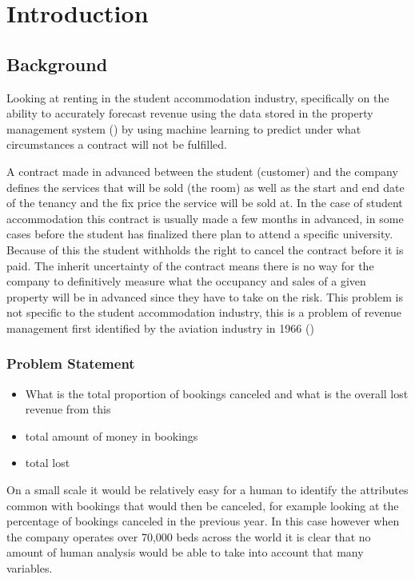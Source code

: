 \chapter{Introduction}

\section{Background}
Looking at renting in the student accommodation industry, specifically on the ability to accurately forecast revenue using the data stored in the property management system (\cite{Jain2006IntellectualPerspective}) by using machine learning to predict under what circumstances a contract will not be fulfilled.

\vspace{5mm}

A contract made in advanced between the student (customer) and the company defines the services that will be sold (the room) as well as the start and end date of the tenancy and the fix price the service will be sold at. In the case of student accommodation this contract is usually made a few months in advanced, in some cases before the student has finalized there plan to attend a specific university. Because of this the student withholds the right to cancel the contract before it is paid. The inherit uncertainty of the contract means there is no way for the company to definitively measure what the occupancy and sales of a given property will be in advanced since they have to take on the risk. This problem is not specific to the student accommodation industry, this is a problem of revenue management first identified by the aviation industry in 1966  (\cite{Chiang2007AnResearch})


\subsection{Problem Statement}

\begin{itemize}
\item What is the total proportion of bookings canceled and what is the overall lost revenue from this
\item total amount of money in bookings
\item total lost 
\end{itemize}


On a small scale it would be relatively easy for a human to identify the attributes common with bookings that would then be canceled, for example looking at the percentage of bookings canceled in the previous year. In this case however when the company operates over 70,000 beds across the world it is clear that no amount of human analysis would be able to take into account that many variables. 

